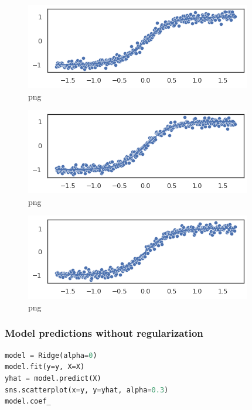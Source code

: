 \begin{figure}
\centering
\includegraphics{fig/normality_and_linearity_violation_files/normality_and_linearity_violation_3_1.png}
\caption{png}
\end{figure}

\begin{figure}
\centering
\includegraphics{fig/normality_and_linearity_violation_files/normality_and_linearity_violation_3_2.png}
\caption{png}
\end{figure}

\begin{figure}
\centering
\includegraphics{fig/normality_and_linearity_violation_files/normality_and_linearity_violation_3_3.png}
\caption{png}
\end{figure}

\hypertarget{model-predictions-without-regularization}{%
\subsubsection{\texorpdfstring{Model predictions \textbf{without}
regularization}{Model predictions without regularization}}\label{model-predictions-without-regularization}}

\begin{lstlisting}[language=Python]
model = Ridge(alpha=0)
model.fit(y=y, X=X)
yhat = model.predict(X)
sns.scatterplot(x=y, y=yhat, alpha=0.3)
model.coef_
\end{lstlisting}

